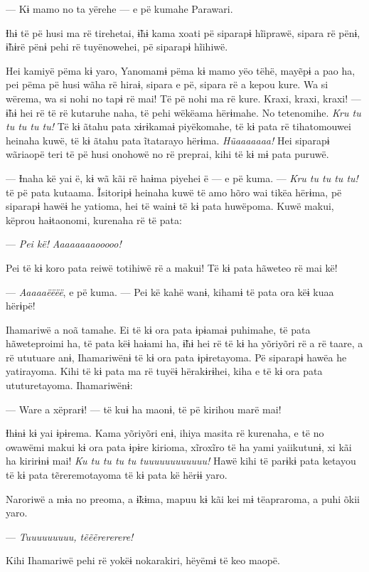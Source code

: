 --- Kɨ mamo no ta yërehe --- e pë kumahe Parawari. 

Ɨhɨ të pë husi ma rë tirehetai, ɨ̃hɨ kama xoati pë siparapɨ hĩiprawë,
sipara rë pënɨ, ɨ̃hɨrë pënɨ pehi rë tuyënowehei, pë siparapɨ hĩihiwë. 

Hei kamiyë pëma kɨ yaro, Yanomamɨ pëma kɨ mamo yëo tëhë, mayẽpɨ a pao
ha, pei pëma pë husi wãha rë hiraɨ, sipara e pë, sipara rë a kepou kure.
Wa si wërema, wa si nohi no tapɨ rë mai! Të pë nohi ma rë kure. Kraxi,
kraxi, kraxi! --- ɨ̃hɨ hei rë të rë kutaruhe naha, të pehi wëkëama
hërɨmahe. No tetenomihe. \textit{Kru tu tu tu tu tu!} Të kɨ ãtahu pata xɨrɨkamaɨ
piyëkomahe, të kɨ pata rë tihatomouwei heinaha kuwë, të kɨ ãtahu pata
ĩtatarayo hërɨma. \textit{Hũaaaaaaa!} Hei siparapɨ wãriaopë teri të pë husi
onohowë no rë preprai, kihi të kɨ mɨ pata puruwë. 

--- Ɨnaha kë yai ë, kɨ wã kãi rë haɨma piyehei ë --- e pë kuma. --- \textit{Kru
tu tu tu tu!} të pë pata kutaama. Ĩsitoripɨ heinaha kuwë të amo hõro wai
tikëa hërɨma, pë siparapɨ hawëɨ he yatioma, hei të wainɨ të kɨ pata
huwëpoma. Kuwë makui, këprou haɨtaonomi, kurenaha rë të pata:

--- \textit{Pei kë!} \textit{Aaaaaaaaooooo!} 

Pei të kɨ koro pata reiwë totihiwë rë a makui! Të kɨ pata hãweteo rë mai
kë! 

--- \textit{Aaaaaëëëë}, e pë kuma. --- Pei kë kahë wanɨ, kihamɨ të pata ora këɨ
kuaa hërɨpë! 

Ihamariwë a noã tamahe. Ei të kɨ ora pata ɨpɨamaɨ puhimahe, të pata
hãweteproimi ha, të pata këɨ haɨami ha, ɨ̃hɨ hei rë të kɨ ha yõriyõri rë
a rë taare, a rë ututuare anɨ, Ihamariwënɨ të kɨ ora pata ɨpɨretayoma.
Pë siparapɨ hawëa he yatirayoma. Kihi të kɨ pata ma rë tuyëɨ
hërakɨrɨhei, kiha e të kɨ ora pata ututuretayoma. Ihamariwënɨ: 

--- Ware a xëprarɨ! --- të kuɨ ha maonɨ, të pë kirihou marë mai!

Ɨhɨnɨ kɨ yai ɨpɨrema. Kama yõriyõri enɨ, ihiya masita rë kurenaha, e të
no owawëmi makui kɨ ora pata ɨpɨre kirioma, xĩroxĩro të ha yami
yaiikutunɨ, xi kãi ha kirirɨnɨ mai! \textit{Ku tu tu tu tu tuuuuuuuuuuuu!} Hawë
kihi të parɨkɨ pata ketayou të kɨ pata tẽreremotayoma të kɨ pata kë
hërɨɨ yaro. 

Naroriwë a mɨa no preoma, a ɨ̃kɨma, mapuu kɨ kãi kei mɨ tëapraroma, a
puhi õkii yaro. 

--- \textit{Tuuuuuuuuu, tẽẽẽrererere!} 

Kihi Ihamariwë pehi rë yokëɨ nokarakiri, hëyëmɨ të keo maopë. 


